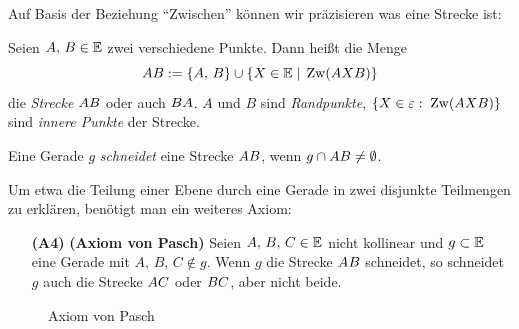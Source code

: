 
Auf Basis der Beziehung "`Zwischen"' können wir präzisieren was eine Strecke ist:

\begin{defi}[Strecke]
    Seien $A,\,B\in \mathbb E$ zwei verschiedene Punkte. Dann heißt die Menge
    $$
    {AB}:=\{A,\,B\}\cup\{X\in\mathbb E \; | \;\operatorname{Zw}(AXB)\}
    $$
    die {\em Strecke} ${AB}$ oder auch ${BA}$. $A$ und $B$ sind {\em Randpunkte}, $\{X \in
    \varepsilon:\; \operatorname{Zw}(AXB)\}$ sind {\em innere Punkte} der Strecke.
\end{defi}

Eine Gerade $g$ \emph{schneidet} eine Strecke ${AB}$, wenn $g\cap{AB}\neq \emptyset$.

Um etwa die Teilung einer Ebene durch eine Gerade in zwei disjunkte Teilmengen
zu erklären, benötigt man ein weiteres Axiom:


\begin{enumerate}
    \item[{\bf (A4)}] {\bf (Axiom von Pasch)} Seien $A,\,B,\,C\in\mathbb E$ nicht kollinear und
        $g\subset\mathbb E$ eine Gerade mit $A,\,B,\,C\notin g$. Wenn $g$ die Strecke ${AB}$ schneidet,
        so schneidet $g$ auch die Strecke ${AC}$ oder ${BC}$, aber nicht beide.
\end{enumerate}


\begin{figure}[h]
    
    \caption{Axiom von Pasch}
\end{figure}


